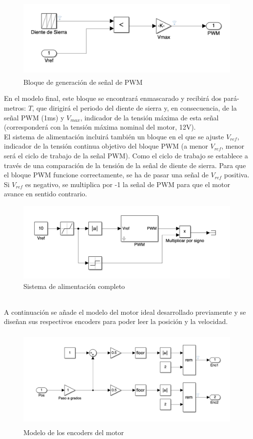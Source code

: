 \documentclass[a4paper, 12pt]{article}
\begin{document}
\begin{figure}[h!]
	\centering
	\includegraphics[height=4cm]{bloquepwm}
	\caption{Bloque de generación de señal de PWM}
\end{figure}


En el modelo final, este bloque se encontrará enmascarado y recibirá dos pará- metros: $T$, que dirigirá el periodo del diente de sierra y, en consecuencia, de la señal PWM (1ms) y $V_{max}$, indicador de la tensión máxima de esta señal (corresponderá con la tensión máxima nominal del motor, 12V).\\ 

El sistema de alimentación incluirá también un bloque en el que se ajuste $V_{ref}$, indicador de la tensión continua objetivo del bloque PWM (a menor $V_{ref}$, menor será el ciclo de trabajo de la señal PWM). Como el ciclo de trabajo se establece a través de una comparación de la tensión de la señal de diente de sierra. Para que el bloque PWM funcione correctamente, se ha de pasar una señal de $V_{ref}$ positiva. Si $V_{ref}$ es negativo, se multiplica por -1 la señal de PWM para que el motor avance en sentido contrario.\\
\begin{figure}[h!]
	\centering
	\includegraphics[height=4cm]{alimentador}
	\caption{Sistema de alimentación completo}
\end{figure}\\

A continuación se añade el modelo del motor ideal desarrollado previamente y se diseñan sus respectivos encoders para poder leer la posición y la velocidad. 
\begin{figure}[h!]
	\centering
	\includegraphics[height = 5cm]{encoders}
	\caption{Modelo de los encoders del motor}
\end{figure}
\end{document}
